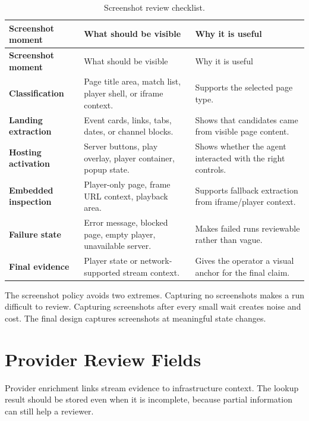 \begin{longtable}{>{\raggedright\arraybackslash\bfseries}p{3.6cm}
                  >{\raggedright\arraybackslash}p{4.6cm}
                  >{\raggedright\arraybackslash}p{5.5cm}}
\caption{Screenshot review checklist.}
\label{tab:screenshot-review-checklist}\\
\toprule
\rowcolor{accent!8}
Screenshot moment & What should be visible & Why it is useful \\
\midrule
\endfirsthead
\toprule
\rowcolor{accent!8}
Screenshot moment & What should be visible & Why it is useful \\
\midrule
\endhead
\bottomrule
\endfoot
Classification & Page title area, match list, player shell, or iframe context. &
Supports the selected page type. \\
Landing extraction & Event cards, links, tabs, dates, or channel blocks. &
Shows that candidates came from visible page content. \\
Hosting activation & Server buttons, play overlay, player container, popup state.
& Shows whether the agent interacted with the right controls. \\
Embedded inspection & Player-only page, frame URL context, playback area. &
Supports fallback extraction from iframe/player context. \\
Failure state & Error message, blocked page, empty player, unavailable server. &
Makes failed runs reviewable rather than vague. \\
Final evidence & Player state or network-supported stream context. & Gives the
operator a visual anchor for the final claim. \\
\end{longtable}

The screenshot policy avoids two extremes. Capturing no screenshots makes a run
difficult to review. Capturing screenshots after every small wait creates noise
and cost. The final design captures screenshots at meaningful state changes.

\section{Provider Review Fields}

Provider enrichment links stream evidence to infrastructure context. The lookup
result should be stored even when it is incomplete, because partial information
can still help a reviewer.

